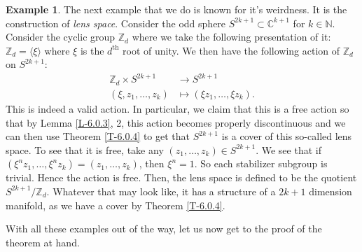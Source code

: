 \documentclass[letterpaper,11pt,twoside]{article}
\theoremstyle{definition}
\theoremstyle{definition}
\theoremstyle{definition}
\theoremstyle{definition}
\theoremstyle{definition}
\newtheorem*{example}{\textbf{Example}}
\theoremstyle{definition}
\theoremstyle{remark}
\theoremstyle{definition}
\newcommand{\Z}[0]{\mathbb{Z}}
\newcommand{\gen}[1]{\langle #1\rangle}
\begin{document}
\begin{example}
	The next example that we do is known for it's weirdness. It is the construction of \textit{lens space}. Consider the odd sphere $ S^{2k+1} \subset \mathbb{C}^{k+1}$ for $ k \in \mathbb{N}$. Consider the cyclic group $ \Z_d $ where we take the following presentation of it: $ \Z_d =  \gen{\xi}$ where $ \xi $ is the $ d^\text{th} $ root of unity. We then have the following action of $ \Z_d $ on $ S^{2k+1} $:
	\begin{align*}
		\Z_d \times S^{2k+1} &\longrightarrow S^{2k+1}\\
		(\xi,z_1,\dots,z_k) &\longmapsto (\xi z_1,\dots,\xi z_k).
	\end{align*}
	This is indeed a valid action. In particular, we claim that this is a free action so that by Lemma \ref{L-6.0.3}, 2, this action becomes properly discontinuous and we can then use Theorem \ref{T-6.0.4} to get that $ S^{2k+1} $ is a cover of this so-called lens space. To see that it is free, take any $ (z_1,\dots,z_k) \in S^{2k+1} $. We see that if $ (\xi^n z_1,\dots,\xi^n z_k) = (z_1,\dots,z_k) $, then $ \xi^n = 1 $. So each stabilizer subgroup is trivial. Hence the action is free. Then, the lens space is defined to be the quotient $ S^{2k+1}/\Z_d $. Whatever that may look like, it has a structure of a $ 2k+1 $ dimension manifold, as we have a cover by Theorem \ref{T-6.0.4}.
\end{example}
With all these examples out of the way, let us now get to the proof of the theorem at hand.
\end{document}
